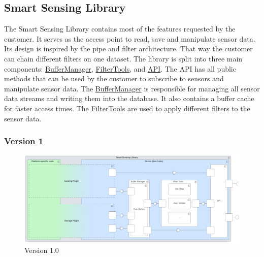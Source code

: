 \documentclass[12pt]{article}
\begin{document}
\subsection{Smart Sensing Library}
The Smart Sensing Library contains most of the features requested by the customer. It serves as the access point to read, save and manipulate sensor data. Its design is inspired by the pipe and filter architecture. That way the customer can chain different filters on one dataset. The library is split into three main components: \hyperref[fig:bild7]{BufferManager}, \hyperref[fig:bild8]{FilterTools}, and \hyperref[fig:bild5]{API}. The API has all public methods that can be used by the customer to subscribe to sensors and manipulate sensor data. The \hyperref[fig:bild7]{BufferManager} is responsible for managing all sensor data streams and writing them into the database. It also contains a buffer cache for faster access times. The \hyperref[fig:bild8]{FilterTools} are used to apply different filters to the sensor data.

\subsubsection{Version 1}
\begin{figure}[ht]
\includegraphics[width=1\textwidth]{Graphics/SmartSensingLibraryOld.png}
\caption{\label{fig:bild1}Version 1.0}
\end{figure}
\end{document}
